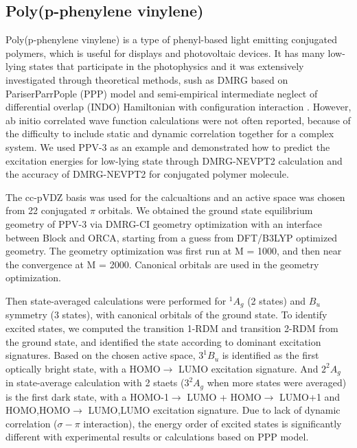 \subsection{Poly(p-phenylene vinylene)}

Poly(p-phenylene vinylene) is a type of phenyl-based light emitting conjugated polymers, which is useful for displays and photovoltaic devices. It has many low-lying states that participate in the photophysics and it was extensively investigated through theoretical methods, sush as DMRG based on Pariser\textendash Parr\textendash Pople (PPP) model \cite{shukla_correlated_2002,bursill_symmetry-adapted_2009} and semi-empirical intermediate neglect of differential overlap (INDO) Hamiltonian with configuration interaction \cite{beljonne_theoretical_1995}. 
However, ab initio correlated wave function calculations were not often reported, because of the difficulty to include static and dynamic correlation together for a complex system.
We used PPV-3 as an example and demonstrated how to predict the excitation energies for low-lying state through DMRG-NEVPT2 calculation and the accuracy of DMRG-NEVPT2 for conjugated polymer molecule.

The cc-pVDZ basis was used for the calcualtions and an active space was chosen from 22 conjugated $\pi$ orbitals. We obtained the ground state equilibrium geometry of PPV-3 via DMRG-CI geometry optimization\cite{hu_excited-state_2015} with an interface between Block and ORCA\cite{neese_orca_2012}, starting from a guess from DFT/B3LYP optimized geometry. The geometry optimization was first run at M = 1000, and then near the convergence at M = 2000. Canonical orbitals are used in the geometry optimization.

Then state-averaged calculations were performed for $^1A_g$ (2 states) and $B_u$ symmetry (3 states), with canonical orbitals of the ground state. 
To identify excited states, we computed the transition 1-RDM and transition 2-RDM from the ground state, and identified the state according to dominant excitation signatures.
Based on the chosen active space, $3^1B_u$ is identified as the first optically bright state, with a HOMO$\rightarrow$ LUMO excitation signature. And $2^2A_g$ in state-average calculation with 2 staets ($3^2A_g$ when more states were averaged) is the first dark state, with a HOMO-1$\rightarrow$ LUMO + HOMO$\rightarrow$ LUMO+1 and HOMO,HOMO$\rightarrow$ LUMO,LUMO excitation signature.
Due to lack of dynamic correlation ($\sigma-\pi$ interaction), the energy order of excited states is significantly different with experimental results or calculations based on PPP model\cite{shukla_correlated_2002,bursill_symmetry-adapted_2009}.

